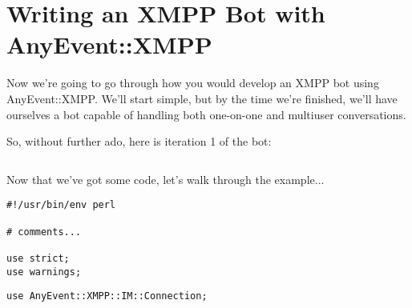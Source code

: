 \part{Writing an XMPP Bot with AnyEvent::XMPP}

\newpage
Now we're going to go through how you would develop an XMPP bot
using AnyEvent::XMPP.  We'll start simple, but by the time we're
finished, we'll have ourselves a bot capable of handling both one-on-one
and multiuser conversations.

\pause
So, without further ado, here is iteration 1 of the bot:

\pause

\begin{shaded}
\inputminted{perl}{examples/bare-bot.pl}
\end{shaded}

\pause

Now that we've got some code, let's walk through the example...

\newpage

\begin{shaded}
\begin{verbatim}
#!/usr/bin/env perl

# comments...

use strict;
use warnings;
\end{verbatim}
\end{shaded}

\pause
\begin{comment}
You should be familiar with this part already!
\end{comment}

\begin{shaded}
\begin{verbatim}
use AnyEvent::XMPP::IM::Connection;
\end{verbatim}
\end{shaded}

\pause
\begin{comment}
This statement loads the AnyEvent::XMPP::IM::Connection class.  Normally I wouldn't
waste my time explaining a use statement, but I just want to make sure you know there
are three connection classes in AnyEvent::XMPP:

\begin{description}
\item[AnyEvent::XMPP::Connection] Simple connections; no bells and whistles.
\item[AnyEvent::XMPP::IM::Connection] Provides more advanced events (message, contact_request_subscribe), initial presence, roster.
\item[AnyEvent::XMPP::Client] Manages multiple connections.
\end{description}
\end{comment}

